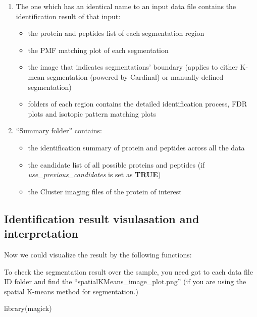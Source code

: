 \documentclass[
]{article}
\newenvironment{Shaded}{\begin{snugshade}}{\end{snugshade}}
\newcommand{\FunctionTok}[1]{\textcolor[rgb]{0.00,0.00,0.00}{#1}}
\newcommand{\NormalTok}[1]{#1}
\providecommand{\tightlist}{%
  \setlength{\itemsep}{0pt}\setlength{\parskip}{0pt}}
\begin{document}
\begin{enumerate}
\def\labelenumi{\arabic{enumi}.}
\tightlist
\item
  The one which has an identical name to an input data file contains the
  identification result of that input:

  \begin{itemize}
  \tightlist
  \item
    the protein and peptides list of each segmentation region
  \item
    the PMF matching plot of each segmentation
  \item
    the image that indicates segmentations' boundary (applies to either
    K-mean segmentation (powered by Cardinal) or manually defined
    segmentation)
  \item
    folders of each region contains the detailed identification process,
    FDR plots and isotopic pattern matching plots
  \end{itemize}
\item
  ``Summary folder'' contains:

  \begin{itemize}
  \tightlist
  \item
    the identification summary of protein and peptides across all the
    data
  \item
    the candidate list of all possible proteins and peptides (if
    \emph{use\_previous\_candidates} is set as \textbf{TRUE})
  \item
    the Cluster imaging files of the protein of interest
  \end{itemize}
\end{enumerate}

\hypertarget{identification-result-visulasation-and-interpretation}{%
\subsection{Identification result visulasation and
interpretation}\label{identification-result-visulasation-and-interpretation}}

Now we could visualize the result by the following functions:

To check the segmentation result over the sample, you need got to each
data file ID folder and find the ``spatialKMeans\_image\_plot.png'' (if
you are using the spatial K-means method for segmentation.)

\begin{Shaded}
\begin{Highlighting}[]
\FunctionTok{library}\NormalTok{(magick)}
\end{Highlighting}
\end{Shaded}
\end{document}
